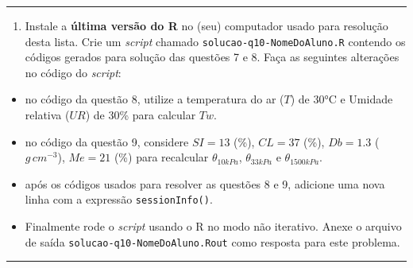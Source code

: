 \documentclass[]{book}
\providecommand{\tightlist}{%
  \setlength{\itemsep}{0pt}\setlength{\parskip}{0pt}}
\begin{document}
\begin{center}\rule{0.5\linewidth}{\linethickness}\end{center}

\begin{enumerate}
\def\labelenumi{\arabic{enumi}.}
\setcounter{enumi}{9}
\tightlist
\item
  Instale a \textbf{última versão do R} no (seu) computador usado para
  resolução desta lista. Crie um \emph{script} chamado
  \texttt{solucao-q10-NomeDoAluno.R} contendo os códigos gerados para
  solução das questões 7 e 8. Faça as seguintes alterações no código do
  \emph{script}:
\end{enumerate}

\begin{itemize}
\item
  no código da questão 8, utilize a temperatura do ar (\(T\)) de 30°C e
  Umidade relativa (\(UR\)) de 30\% para calcular \(Tw\).
\item
  no código da questão 9, considere \(SI = 13\) (\%), \(CL = 37\) (\%),
  \(Db = 1.3\) (\(g \, cm^{-3}\)), \(Me = 21\) (\%) para recalcular
  \(\theta_{10kPa}\), \(\theta_{33kPa}\) e \(\theta_{1500kPa}\).
\item
  após os códigos usados para resolver as questões 8 e 9, adicione uma
  nova linha com a expressão \texttt{sessionInfo()}.
\item
  Finalmente rode o \emph{script} usando o R no modo não iterativo.
  Anexe o arquivo de saída \texttt{solucao-q10-NomeDoAluno.Rout} como
  resposta para este problema.
\end{itemize}

\begin{center}\rule{0.5\linewidth}{\linethickness}\end{center}
\end{document}
